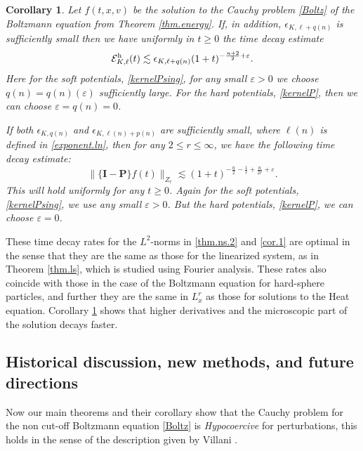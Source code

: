 \documentclass{amsart}
\newtheorem{corollary}[theorem]{Corollary}
\numberwithin{equation}{section}
\begin{document}
\begin{corollary}\label{cor}
Let ${f}(t,x,{v})$ be the solution to the Cauchy problem \eqref{Boltz} of the Boltzmann equation from Theorem \ref{thm.energy}.  If, in addition, ${\epsilon}_{{K},{\ell}+{q({n})}}$ is sufficiently small then we have uniformly in $t\geq 0$ the time decay estimate
\begin{equation}\label{thm.ns.3}
    {\mathcal{E}}_{{K},{\ell}}^{\rm h}(t)  \lesssim  {\epsilon}_{{K},{\ell}+{q({n})}} (1+t)^{-\frac{{n}+2}{2}+\varepsilon}.
\end{equation}
Here for the soft potentials, \eqref{kernelPsing}, for any small $\varepsilon > 0$ we choose 
${q({n})} ={q({n})}(\varepsilon)$ sufficiently large.  For the hard potentials, \eqref{kernelP}, then we can choose  $\varepsilon = {q({n})}= 0$.

If both ${\epsilon}_{{K},{q({n})}}$ and ${\epsilon}_{{K},{\ell({n})}+{p({n})}}$ are sufficiently small, 
where ${\ell({n})}$ is defined in \eqref{exponent.ln}, then
 for any $2\leq r\leq \infty$, we have the following time decay estimate:  
\begin{equation}
  \|\{{\mathbf{I}}-{\mathbf{P}}\}{f}(t)\|_{Z_r}\lesssim(1+t)^{-\frac{n}{2}
 -\frac{1}{r}+\frac{n}{2r}+\varepsilon}.\label{cor.2}
\end{equation}
This will hold uniformly for any $t\geq 0$.    Again for the soft potentials, \eqref{kernelPsing}, we use any small $\varepsilon > 0$.  But the hard potentials, \eqref{kernelP}, we can choose  $\varepsilon = 0$.
\end{corollary}

These time decay rates for the $L^2$-norms in \eqref{thm.ns.2} and \eqref{cor.1} 
are optimal in the sense that they are the same as those for the linearized system, as in Theorem \ref{thm.ls}, which is studied using Fourier analysis.  These rates also coincide with those in the case of the Boltzmann equation \cite{MR0363332} for hard-sphere particles, and further they are the same in $L^r_x$ as those for solutions to the Heat equation. Corollary \ref{cor} shows that higher derivatives and the microscopic part of the solution decays faster.

\subsection{Historical discussion, new methods, and future directions}
Now our main theorems and their corollary show that the Cauchy problem for the non cut-off Boltzmann equation \eqref{Boltz} is {\it Hypocoercive} for perturbations, this holds in the sense of the description given by Villani \cite{villani-2006}.
\end{document}
